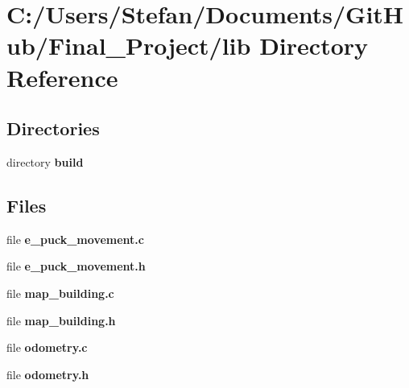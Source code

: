 \section{C\-:/\-Users/\-Stefan/\-Documents/\-Git\-Hub/\-Final\-\_\-\-Project/lib Directory Reference}
\label{dir_783716f39f3be2b206cf8f00b0340903}
\subsection*{Directories}
\begin{DoxyCompactItemize}
\item 
directory {\bf build}
\end{DoxyCompactItemize}
\subsection*{Files}
\begin{DoxyCompactItemize}
\item 
file {\bf e\-\_\-puck\-\_\-movement.\-c}
\item 
file {\bf e\-\_\-puck\-\_\-movement.\-h}
\item 
file {\bf map\-\_\-building.\-c}
\item 
file {\bf map\-\_\-building.\-h}
\item 
file {\bf odometry.\-c}
\item 
file {\bf odometry.\-h}
\end{DoxyCompactItemize}
